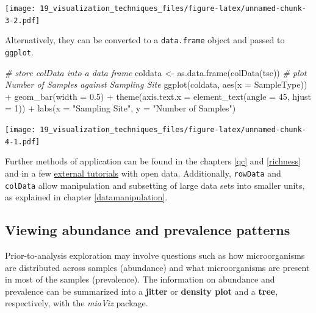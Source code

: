 \documentclass[
]{book}
\newenvironment{Shaded}{\begin{snugshade}}{\end{snugshade}}
\newcommand{\AttributeTok}[1]{\textcolor[rgb]{0.77,0.63,0.00}{#1}}
\newcommand{\CommentTok}[1]{\textcolor[rgb]{0.56,0.35,0.01}{\textit{#1}}}
\newcommand{\DecValTok}[1]{\textcolor[rgb]{0.00,0.00,0.81}{#1}}
\newcommand{\FloatTok}[1]{\textcolor[rgb]{0.00,0.00,0.81}{#1}}
\newcommand{\FunctionTok}[1]{\textcolor[rgb]{0.00,0.00,0.00}{#1}}
\newcommand{\NormalTok}[1]{#1}
\newcommand{\OtherTok}[1]{\textcolor[rgb]{0.56,0.35,0.01}{#1}}
\newcommand{\SpecialCharTok}[1]{\textcolor[rgb]{0.00,0.00,0.00}{#1}}
\newcommand{\StringTok}[1]{\textcolor[rgb]{0.31,0.60,0.02}{#1}}
\begin{document}
\texttt{[image: 19\_visualization\_techniques\_files/figure-latex/unnamed-chunk-3-2.pdf]}

Alternatively, they can be converted to a \texttt{data.frame} object and
passed to \texttt{ggplot}.

\begin{Shaded}
\begin{Highlighting}[]
\CommentTok{\# store colData into a data frame}
\NormalTok{coldata }\OtherTok{\textless{}{-}} \FunctionTok{as.data.frame}\NormalTok{(}\FunctionTok{colData}\NormalTok{(tse))}
\CommentTok{\# plot Number of Samples against Sampling Site}
\FunctionTok{ggplot}\NormalTok{(coldata, }\FunctionTok{aes}\NormalTok{(}\AttributeTok{x =}\NormalTok{ SampleType)) }\SpecialCharTok{+}
  \FunctionTok{geom\_bar}\NormalTok{(}\AttributeTok{width =} \FloatTok{0.5}\NormalTok{) }\SpecialCharTok{+}
  \FunctionTok{theme}\NormalTok{(}\AttributeTok{axis.text.x =} \FunctionTok{element\_text}\NormalTok{(}\AttributeTok{angle =} \DecValTok{45}\NormalTok{, }\AttributeTok{hjust =} \DecValTok{1}\NormalTok{)) }\SpecialCharTok{+}
  \FunctionTok{labs}\NormalTok{(}\AttributeTok{x =} \StringTok{"Sampling Site"}\NormalTok{,}
       \AttributeTok{y =} \StringTok{"Number of Samples"}\NormalTok{)}
\end{Highlighting}
\end{Shaded}

\texttt{[image: 19\_visualization\_techniques\_files/figure-latex/unnamed-chunk-4-1.pdf]}

Further methods of application can be found in the chapters \ref{qc}
and \ref{richness} and in a few \href{https://github.com/davismcc/scater_tutorials_open_data}{external
tutorials}
with open data. Additionally, \texttt{rowData} and \texttt{colData} allow
manipulation and subsetting of large data sets into smaller units, as
explained in chapter \ref{datamanipulation}.

\hypertarget{viewing-abundance-and-prevalence-patterns}{%
\subsection{Viewing abundance and prevalence patterns}\label{viewing-abundance-and-prevalence-patterns}}

Prior-to-analysis exploration may involve questions such as how microorganisms
are distributed across samples (abundance) and what microorganisms are present
in most of the samples (prevalence). The information on abundance and prevalence
can be summarized into a \textbf{jitter} or \textbf{density plot} and a \textbf{tree},
respectively, with the \emph{miaViz} package.
\end{document}
